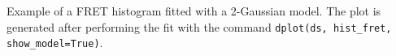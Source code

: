 \label{fig:histfit} Example of a FRET histogram fitted with a 2-Gaussian model. The plot is generated after performing the fit with the command \texttt{dplot(ds, hist\_fret, show\_model=True)}.
